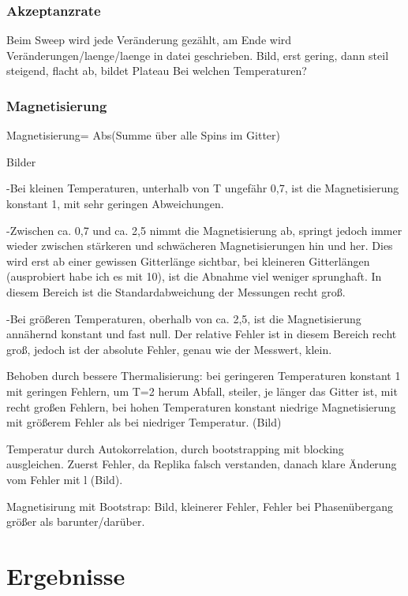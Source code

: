 \documentclass{scrreprt}
\begin{document}
	\subsection{Akzeptanzrate}
	Beim Sweep wird jede Veränderung gezählt, am Ende wird Veränderungen/laenge/laenge in datei geschrieben. Bild, erst gering, dann steil steigend, flacht ab, bildet Plateau
	Bei welchen Temperaturen?
	\subsection{Magnetisierung}
	Magnetisierung= Abs(Summe über alle Spins im Gitter)
	
	Bilder
	
	-Bei kleinen Temperaturen, unterhalb von T ungefähr 0,7, ist die
	 Magnetisierung konstant 1, mit sehr geringen Abweichungen.
	 
	 -Zwischen ca. 0,7 und ca. 2,5 nimmt die Magnetisierung ab, springt jedoch
	 immer wieder zwischen stärkeren und schwächeren Magnetisierungen hin und
	 her. Dies wird erst ab einer gewissen Gitterlänge sichtbar, bei kleineren
	 Gitterlängen (ausprobiert habe ich es mit 10), ist die Abnahme viel weniger
	 sprunghaft. In diesem Bereich ist die Standardabweichung der Messungen recht
	 groß.
	 
	 -Bei größeren Temperaturen, oberhalb von ca. 2,5, ist die Magnetisierung
	 annähernd konstant und fast null. Der relative Fehler ist in diesem Bereich
	 recht groß, jedoch ist der absolute Fehler, genau wie der Messwert, klein.
	 
	 Behoben durch bessere Thermalisierung: bei geringeren Temperaturen konstant 1 mit geringen Fehlern, 
	 um T=2 herum Abfall, steiler, je länger das Gitter ist, mit recht großen Fehlern, bei hohen Temperaturen konstant niedrige Magnetisierung mit größerem Fehler als bei niedriger Temperatur. (Bild)
	 
	 Temperatur durch Autokorrelation, durch bootstrapping mit blocking ausgleichen. 
	 Zuerst Fehler, da Replika falsch verstanden, danach klare Änderung vom Fehler mit l (Bild).
	 
	 Magnetisirung mit Bootstrap: Bild, kleinerer Fehler, Fehler bei Phasenübergang größer als barunter/darüber.
	 
	\chapter{Ergebnisse}
	\listoffigures
	\listoftables
	
	
	
	\printbibliography[heading=bibintoc]
\end{document}
